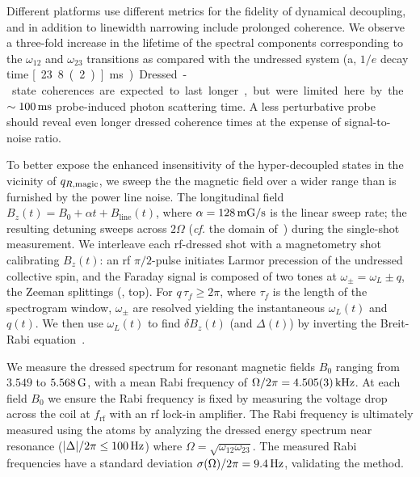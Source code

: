 \documentclass[aps,prl,reprint,superscriptaddress,floatfix]{revtex4-1}
\begin{document}
Different platforms use different metrics for the fidelity of dynamical decoupling, and in addition to linewidth narrowing include prolonged coherence.
We observe a three-fold increase in the lifetime of the spectral components corresponding to the $\omega_{12}$ and $\omega_{23}$ transitions as compared with the undressed system (a, $1/e$ decay time \unit[23.8(2)]{ms}).
Dressed-state coherences are expected to last longer, but were limited here by the $\sim\unit[100]{ms}$ probe-induced photon scattering time.
A less perturbative probe~\cite{jasperse_magic-wavelength_2017} should reveal even longer dressed coherence times at the expense of signal-to-noise ratio. 

To better expose the enhanced insensitivity of the hyper-decoupled states in the vicinity of $q_{R,\text{magic}}$, we sweep the the magnetic field over a wider range than is furnished by the power line noise.
The longitudinal field $B_z(t) = B_0 + \alpha t + B_{\text{line}}(t)$, where $\alpha = \unit[128]{mG/s}$ is the linear sweep rate; the resulting detuning sweeps across $2\Omega$ (\textit{cf.} the domain of~) during the single-shot measurement.
We interleave each rf-dressed shot with a magnetometry shot calibrating $B_z(t)$: an rf $\pi/2$-pulse initiates Larmor precession of the undressed collective spin, and the Faraday signal is composed of two tones at $\omega_\pm = \omega_L \pm q$, the Zeeman splittings (, top).
For $q \, \tau_f \geq 2\pi$, where $\tau_f$ is the length of the spectrogram window, $\omega_\pm$ are resolved yielding the instantaneous $\omega_L(t)$ and $q(t)$.
We then use $\omega_L(t)$ to find $\delta B_z(t)$ (and $\Delta(t)$) by inverting the Breit-Rabi equation~\cite{ramsey_molecular_1956,Note3}.

We measure the dressed spectrum for resonant magnetic fields $B_0$ ranging from $3.549$ to $\unit[5.568]{G}$, with a mean Rabi frequency of $\Omega/2\pi = \unit[4.505(3)]{kHz}$.
At each field $B_0$ we ensure the Rabi frequency is fixed by measuring the voltage drop across the coil at $f_{\text{rf}}$ with an rf lock-in amplifier.
The Rabi frequency is ultimately measured using the atoms by analyzing the dressed energy spectrum near resonance ($\abs{\Delta}/2\pi \leq \unit[100]{Hz}$) where $\Omega = \sqrt{\omega_{12} \omega_{23}}$.
The measured Rabi frequencies have a standard deviation $\sigma(\Omega)/2\pi = \unit[9.4]{Hz}$, validating the  method.
\end{document}
